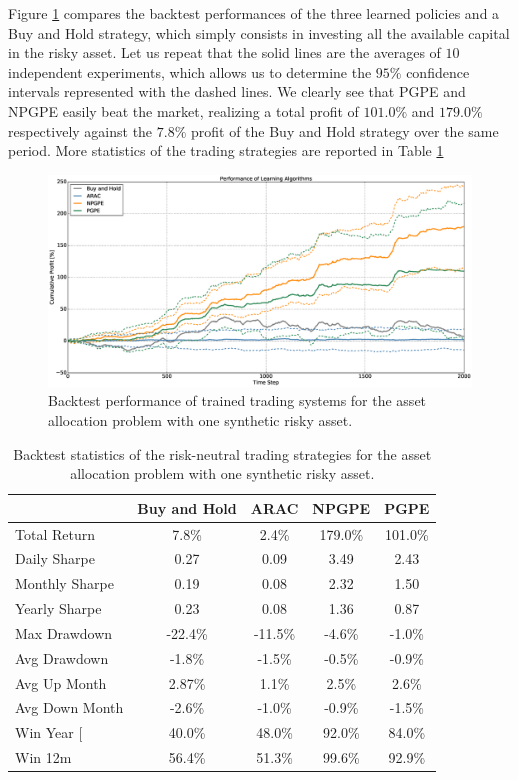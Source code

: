 Figure \ref{fig:single_synthetic_neutral_performance} compares the backtest performances of the three learned policies and a Buy and Hold strategy, which simply consists in investing all the available capital in the risky asset. Let us repeat that the solid lines are the averages of $10$ independent experiments, which allows us to determine the $95\%$ confidence intervals represented with the dashed lines. We clearly see that PGPE and NPGPE easily beat the market, realizing a total profit of $101.0\%$ and $179.0\%$ respectively against the $7.8\%$ profit of the Buy and Hold strategy over the same period. More statistics of the trading strategies are reported in Table \ref{tab:single_synthetic_neutral_performance}
\begin{figure}[t]
	\centering
	\includegraphics[width=1.0\textwidth]{Images/6_1_single_synthetic_neutral_performance}
	\caption[Backtest performance with one synthetic risky asset]{Backtest performance of trained trading systems for the asset allocation problem with one synthetic risky asset.}
	\label{fig:single_synthetic_neutral_performance}
\end{figure}
\begin{table}[t!]
\centering
\begin{tabular}{@{}lcccc@{}}
\toprule
 & Buy and Hold     & ARAC & NPGPE & PGPE \\ \midrule
Total Return        & 7.8\% & 2.4\% & 179.0\% & 101.0\% \\
Daily Sharpe        & 0.27 & 0.09 & 3.49 & 2.43 \\
Monthly Sharpe      & 0.19 & 0.08 & 2.32 & 1.50 \\
Yearly Sharpe       & 0.23 & 0.08 & 1.36 & 0.87 \\
Max Drawdown   & -22.4\% & -11.5\% & -4.6\% & -1.0\% \\
Avg Drawdown    & -1.8\% & -1.5\% & -0.5\% & -0.9\% \\
Avg Up Month    & 2.87\% & 1.1\% & 2.5\% & 2.6\% \\
Avg Down Month  & -2.6\% & -1.0\% & -0.9\% & -1.5\% \\
Win Year [       & 40.0\% & 48.0\% & 92.0\% & 84.0\% \\
Win 12m         & 56.4\% & 51.3\% & 99.6\% & 92.9\% \\ \bottomrule
\end{tabular}%
\caption[Risk-neutral backtest statistics with one synthetic risky asset]{Backtest statistics of the risk-neutral trading strategies for the asset allocation problem with one synthetic risky asset.}
\label{tab:single_synthetic_neutral_performance}
\end{table}


